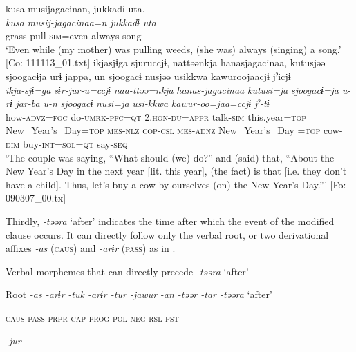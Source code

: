 \ea
{\TM}
\glll  kusa  musijagacinan,  jukkadɨ  uta.\\
\textit{kusa}  \textit{musij-jagacinaa=n}  \textit{jukkadɨ}  \textit{uta}\\
grass  pull-\textsc{sim}=even  always  song\\
\glt ‘Even while (my mother) was pulling weeds, (she was) always (singing) a song.’ [Co: 111113\_01.txt]
\ex
{\TM}
\glll  ikjasjɨga  sjuruccjɨ,  nattəənkja  hanasjagacinaa,      kutusjəə  sjoogacɨja  urɨ  jappa,  un      sjoogacɨ  nusjəə  usikkwa  kawuroojaacjɨ  jˀicjɨ\\
\textit{ikja-sjɨ=ga}  \textit{sɨr-jur-u=ccjɨ}  \textit{naa-ttəə=nkja}  \textit{hanas-jagacinaa} \textit{kutusi=ja}  \textit{sjoogacɨ=ja}  \textit{u-rɨ}  \textit{jar-ba}  \textit{u-n}     \textit{sjoogacɨ}  \textit{nusi=ja}  \textit{usi-kkwa}  \textit{kawur-oo=jaa=ccjɨ}  \textit{jˀ-tɨ}\\
how-\textsc{advz}=\textsc{foc}  do-\textsc{umrk}-\textsc{pfc}=\textsc{qt}  2.\textsc{hon}-\textsc{du}=\textsc{appr}  talk-\textsc{sim}    this.year=\textsc{top}  New\_Year’s\_Day=\textsc{top}  \textsc{mes}-\textsc{nlz}  \textsc{cop}-\textsc{csl}  \textsc{mes}-\textsc{adnz}  New\_Year’s\_Day  \REF=\textsc{top}  cow-\textsc{dim}  buy-\textsc{int}=\textsc{sol}=\textsc{qt}  say-\textsc{seq}\\
\glt ‘The couple was saying, “What should (we) do?” and (said) that, “About the New Year’s Day in the next year [lit. this year], (the fact) is that [i.e. they don’t have a child]. Thus, let’s buy a cow by ourselves (on) the New Year’s Day.”’ [Fo: 090307\_00.tx]

\z
\z

  Thirdly, \textit{-təəra} ‘after’ indicates the time after which the event of the modified clause occurs. It can directly follow only the verbal root, or two derivational affixes \textit{-as} (\textsc{caus}) and \textit{-arɨr} (\textsc{pass}) as in .

\ea\label{ex:8-99}
  Verbal morphemes that can directly precede \textit{-təəra} ‘after’

  Root  \textit{-as  -arɨr} %
\textit{-tuk  -arɨr  -tur  -jawur} %
\textit{-an  -təər  -tar  -təəra} ‘after’

    \textsc{caus}  \textsc{pass}  \textsc{prpr}  \textsc{cap}  \textsc{prog}  \textsc{pol}  \textsc{neg}  \textsc{rsl}  \textsc{pst}

          \textit{-jur}

